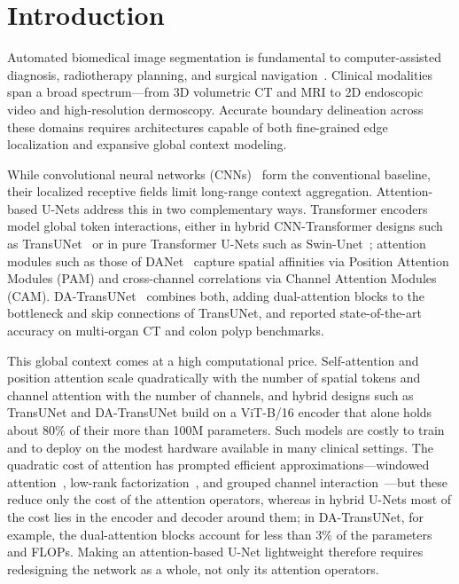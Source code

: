 \section{Introduction}
\label{sec:introduction}

Automated biomedical image segmentation is fundamental to computer-assisted diagnosis, radiotherapy planning, and surgical navigation~\cite{ronneberger2015unet,zhou2018unetpp,chen2021transunet}. Clinical modalities span a broad spectrum---from 3D volumetric CT and MRI to 2D endoscopic video and high-resolution dermoscopy. Accurate boundary delineation across these domains requires architectures capable of both fine-grained edge localization and expansive global context modeling.

While convolutional neural networks (CNNs)~\cite{ronneberger2015unet,zhou2018unetpp,oktay2018attention} form the conventional baseline, their localized receptive fields limit long-range context aggregation. Attention-based U-Nets address this in two complementary ways. Transformer encoders model global token interactions, either in hybrid CNN-Transformer designs such as TransUNet~\cite{chen2021transunet} or in pure Transformer U-Nets such as Swin-Unet~\cite{cao2022swinunet}; attention modules such as those of DANet~\cite{fu2019dual} capture spatial affinities via Position Attention Modules (PAM) and cross-channel correlations via Channel Attention Modules (CAM). DA-TransUNet~\cite{sun2024datransunet} combines both, adding dual-attention blocks to the bottleneck and skip connections of TransUNet, and reported state-of-the-art accuracy on multi-organ CT and colon polyp benchmarks.

This global context comes at a high computational price. Self-attention and position attention scale quadratically with the number of spatial tokens and channel attention with the number of channels, and hybrid designs such as TransUNet and DA-TransUNet build on a ViT-B/16 encoder that alone holds about $80\%$ of their more than 100M parameters. Such models are costly to train and to deploy on the modest hardware available in many clinical settings. The quadratic cost of attention has prompted efficient approximations---windowed attention~\cite{liu2021swin}, low-rank factorization~\cite{wang2020linformer}, and grouped channel interaction~\cite{rahman2024emcad}---but these reduce only the cost of the attention operators, whereas in hybrid U-Nets most of the cost lies in the encoder and decoder around them; in DA-TransUNet, for example, the dual-attention blocks account for less than $3\%$ of the parameters and FLOPs. Making an attention-based U-Net lightweight therefore requires redesigning the network as a whole, not only its attention operators.

